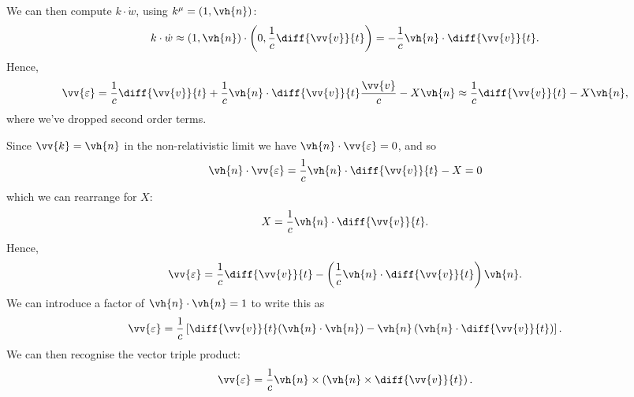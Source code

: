 \documentclass[fleqn]{NotesClass}
\begin{document}
    We can then compute \(k \cdot \dot{w}\), using \(k^\mu = (1, \vh{n})\):
    \begin{equation}
        k\cdot \dot{w} \approx (1, \vh{n}) \cdot \left( 0, \frac{1}{c} \diff{\vv{v}}{t} \right) = -\frac{1}{c} \vh{n} \cdot \diff{\vv{v}}{t}.
    \end{equation}
    Hence,
    \begin{equation}
        \vv{\varepsilon} = \frac{1}{c} \diff{\vv{v}}{t} + \frac{1}{c} \vh{n} \cdot \diff{\vv{v}}{t} \frac{\vv{v}}{c} - X\vh{n} \approx \frac{1}{c} \diff{\vv{v}}{t} - X\vh{n},
    \end{equation}
    where we've dropped second order terms.
    
    Since \(\vv{k} = \vh{n}\) in the non-relativistic limit we have \(\vh{n} \cdot \vv{\varepsilon} = 0\), and so
    \begin{equation}
        \vh{n} \cdot \vv{\varepsilon} = \frac{1}{c} \vh{n} \cdot \diff{\vv{v}}{t} - X = 0
    \end{equation}
    which we can rearrange for \(X\):
    \begin{equation}
        X = \frac{1}{c}\vh{n} \cdot \diff{\vv{v}}{t}.
    \end{equation}
    Hence,
    \begin{equation}
        \vv{\varepsilon} = \frac{1}{c} \diff{\vv{v}}{t} - \left( \frac{1}{c} \vh{n} \cdot \diff{\vv{v}}{t} \right) \vh{n}.
    \end{equation}
    We can introduce a factor of \(\vh{n} \cdot \vh{n} = 1\) to write this as
    \begin{equation}
        \vv{\varepsilon} = \frac{1}{c}\left[ \diff{\vv{v}}{t} (\vh{n} \cdot \vh{n}) - \vh{n} \left( \vh{n} \cdot \diff{\vv{v}}{t} \right) \right].
    \end{equation}
    We can then recognise the vector triple product:
    \begin{equation}
        \vv{\varepsilon} = \frac{1}{c} \vh{n} \times \left( \vh{n} \times \diff{\vv{v}}{t} \right).
    \end{equation}
    
\end{document}
